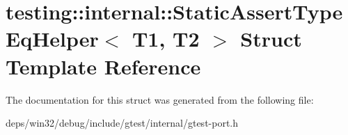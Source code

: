 \hypertarget{structtesting_1_1internal_1_1_static_assert_type_eq_helper}{}\section{testing\+:\+:internal\+:\+:Static\+Assert\+Type\+Eq\+Helper$<$ T1, T2 $>$ Struct Template Reference}
\label{structtesting_1_1internal_1_1_static_assert_type_eq_helper}


The documentation for this struct was generated from the following file\+:\begin{DoxyCompactItemize}
\item 
deps/win32/debug/include/gtest/internal/gtest-\/port.\+h\end{DoxyCompactItemize}
